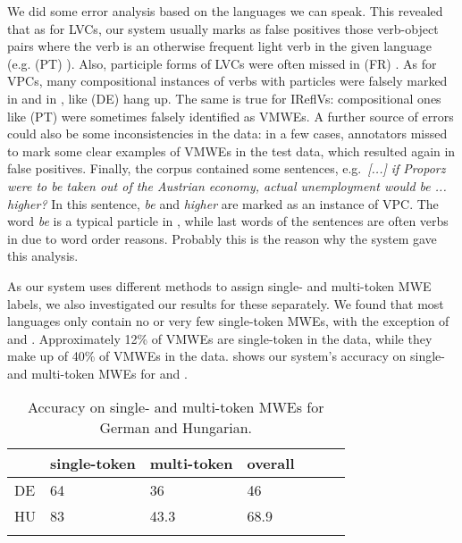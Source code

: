 \documentclass[output=paper,
modfonts,
]{langscibook}
\begin{document}
We did some error analysis based on the languages we can speak. This revealed that as for LVCs, our system usually marks as false positives those verb-object pairs where the verb is an otherwise frequent light verb in the given language (e.g. (PT) ). Also, participle forms of LVCs were often missed in (FR) . As for VPCs, many compositional instances of verbs with particles were falsely marked in  and in , like (DE)  {hang up}. The same is true for IReflVs: compositional ones like (PT)  were sometimes falsely identified as VMWEs. A further source of errors could also be some inconsistencies in the data: in a few cases, annotators missed to mark some clear examples of VMWEs in the test data, which resulted again in false positives. Finally, the  corpus contained some  sentences, e.g.~\textit{[...] if Proporz were to be taken out of the Austrian economy, actual unemployment would be ... higher?} In this sentence, \textit{be} and \textit{higher} are marked as an instance of VPC. The word \textit{be} is a typical particle in , while last words of the sentences are often verbs in  due to word order reasons. Probably this is the reason why the system gave this analysis.

As our system uses different methods to assign single- and multi-token MWE labels, we also investigated our results for these separately. We found that most languages only contain no or very few single-token MWEs, with the exception of  and . Approximately 12\% of VMWEs are single-token in the  data, while they make up of 40\% of VMWEs in the  data.  shows our system's accuracy on single- and multi-token MWEs for  and .

\begin{table}
\centering
\caption{Accuracy on single- and multi-token MWEs for German and Hungarian.}
\label{singletokenresults}
\begin{tabular}{lllllll}
  \lsptoprule
  & single-token & multi-token & overall  \\
 \midrule
 DE  & 64 & 36 & 46   \\
HU  & 83  & 43.3 & 68.9 \\
  \lspbottomrule
\end{tabular}
\end{table}
\end{document}
